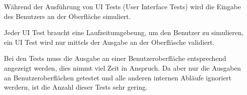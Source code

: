 Während der Ausführung von UI Tests (User Interface Tests) wird die Eingabe des Benutzers an der Oberfläche simuliert.

Jeder UI Test braucht eine Laufzeitumgebeung, um den Benutzer zu simulieren, 
ein UI Test wird nur mittels der Ausgabe an der Oberfläsche validiert. 

Bei den Tests muss die Ausgabe an einer Benutzeroberfläche entsprechend angezeigt werden, dies nimmt viel Zeit in Anspruch.
Da aber nur die Ausgaben an Benutzeroberflächen getestet und alle anderen internen Abläufe ignoriert werdern, ist die Anzahl dieser Tests sehr gering.